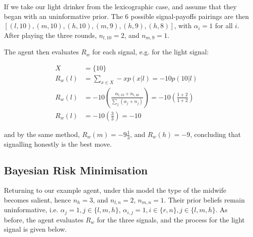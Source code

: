 \documentclass[graybox]{svmult}
\begin{document}
If we take our light drinker from the lexicographic case, and assume that they began with an uninformative prior. The 6 possible signal-payoffs pairings are then \([(l,10),(m,10),(h,10),(m,9),(h,9),(h,8)]\), with \(\alpha_{i}=1\) for all \(i\). After playing the three rounds, \(n_{l,10}=2\), and \(n_{m,9}=1\).

The agent then evaluates \(R_{w}\) for each signal, e.g. for the light signal:

\begin{equation*}
\begin{aligned}
X &= \{10\}\\
R_{w}(l) &= \sum_{x \in X} -xp(x | l) = -10p(10 | l)\\
R_{w}(l) &= -10(\frac{\alpha_{l,10}+n_{l,10}}{\sum_{j}(\alpha_{j}+n_{j})}) = -10(\frac{1+2}{1+2})\\
R_{w}(l) &= -10(\frac{3}{3}) = -10
\end{aligned}
\end{equation*}

and by the same method, \(R_{w}(m)=-9\frac{1}{3}\), and \(R_{w}(h)=-9\), concluding that signalling honestly is the best move.

\subsection{Bayesian Risk Minimisation}
\label{sub:bayes_eg}

Returning to our example agent, under this model the type of the midwife becomes salient, hence \(n_{h}=3\), and \(n_{l,n}=2\), \(n_{m,n}=1\). Their prior beliefs remain uninformative, i.e. \(\alpha_{j} = 1, j \in \{l,m,h\}\), \(\alpha_{i,j}=1,i \in \{r,n\}, j \in \{l,m,h\}\). As before, the agent evaluates \(R_{w}\) for the three signals, and the process for the light signal is given below.
\end{document}

